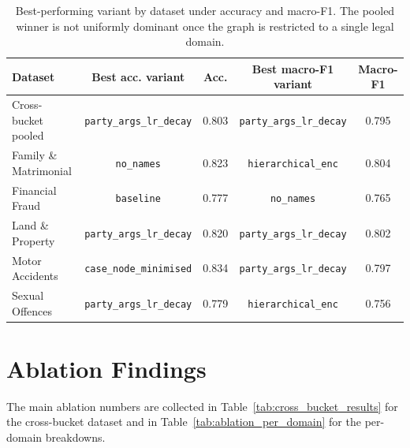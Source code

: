 {\color{blue}
\begin{table}[H]
  \centering
  \scriptsize
  \begin{tabular}{lcccc}
    \toprule
    Dataset & Best acc. variant & Acc. & Best macro-F1 variant & Macro-F1 \\
    \midrule
    Cross-bucket pooled & \texttt{party\_args\_lr\_decay} & 0.803 & \texttt{party\_args\_lr\_decay} & 0.795 \\
    Family \& Matrimonial & \texttt{no\_names} & 0.823 & \texttt{hierarchical\_enc} & 0.804 \\
    Financial Fraud & \texttt{baseline} & 0.777 & \texttt{no\_names} & 0.765 \\
    Land \& Property & \texttt{party\_args\_lr\_decay} & 0.820 & \texttt{party\_args\_lr\_decay} & 0.802 \\
    Motor Accidents & \texttt{case\_node\_minimised} & 0.834 & \texttt{party\_args\_lr\_decay} & 0.797 \\
    Sexual Offences & \texttt{party\_args\_lr\_decay} & 0.779 & \texttt{hierarchical\_enc} & 0.756 \\
    \bottomrule
  \end{tabular}
  \caption{{\color{blue}Best-performing variant by dataset under
  accuracy and macro-F1. The pooled winner is not uniformly dominant
  once the graph is restricted to a single legal domain.}}
  \label{tab:best_variant_by_dataset}
\end{table}
}

\section{Ablation Findings}
\label{sec:ablation_findings}

The main ablation numbers are collected in
Table~\ref{tab:cross_bucket_results} for the cross-bucket dataset and
in Table~\ref{tab:ablation_per_domain} for the per-domain
breakdowns.

